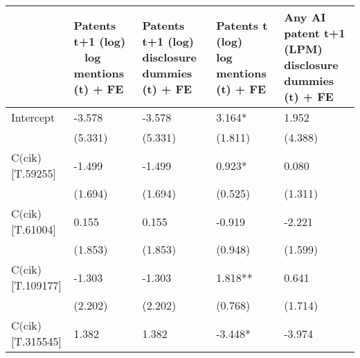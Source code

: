 \begin{table}
\caption{}
\label{}
\begin{center}
\begin{tabular}{lllll}
\hline
                  & Patents t+1 (log) ~ log mentions (t) + FE & Patents t+1 (log) ~ disclosure dummies (t) + FE & Patents t (log) ~ log mentions (t) + FE & Any AI patent t+1 (LPM) ~ disclosure dummies (t) + FE  \\
\hline
Intercept         & -3.578                                    & -3.578                                          & 3.164*                                  & 1.952                                                  \\
                  & (5.331)                                   & (5.331)                                         & (1.811)                                 & (4.388)                                                \\
C(cik)[T.59255]   & -1.499                                    & -1.499                                          & 0.923*                                  & 0.080                                                  \\
                  & (1.694)                                   & (1.694)                                         & (0.525)                                 & (1.311)                                                \\
C(cik)[T.61004]   & 0.155                                     & 0.155                                           & -0.919                                  & -2.221                                                 \\
                  & (1.853)                                   & (1.853)                                         & (0.948)                                 & (1.599)                                                \\
C(cik)[T.109177]  & -1.303                                    & -1.303                                          & 1.818**                                 & 0.641                                                  \\
                  & (2.202)                                   & (2.202)                                         & (0.768)                                 & (1.714)                                                \\
C(cik)[T.315545]  & 1.382                                     & 1.382                                           & -3.448*                                 & -3.974                                                 \\

\end{tabular}
\end{center}
\end{table}
